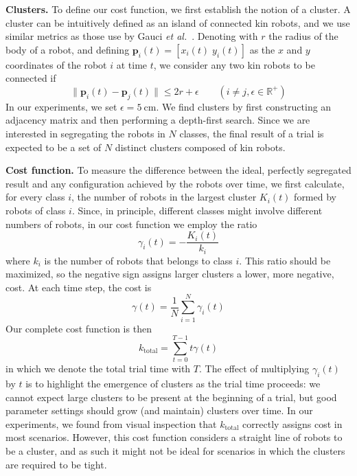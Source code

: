 \documentclass[letterpaper, 10 pt, conference]{ieeeconf}
\newcommand{\myparagraph}[1]{\textbf{#1.}}
\renewcommand{\vec}[1]{\ensuremath{\mathbf{#1}}}
\begin{document}
\myparagraph{Clusters}
To define our cost function, we first establish the notion of a cluster.
A cluster can be intuitively defined as an island of connected kin robots,
and we use similar metrics as those use by Gauci \emph{et al.}~\cite{gauci_evolving_2014}.
Denoting with $r$ the radius of the body of a robot, and defining
$\vec{p}_i(t) = [x_i(t)\;y_i(t)]$ as the $x$ and $y$ coordinates of the robot
$i$ at time $t$, we consider any two kin robots to be connected if
\begin{equation} \label{eq:connected}
  \lVert\vec{p}_i(t) - \vec{p}_j(t)\rVert \le 2r + \epsilon \qquad (i \ne j, \epsilon \in \mathbb{R}^+)
\end{equation}
In our experiments, we set $\epsilon = \SI{5}{\centi\meter}$.
We find clusters by first constructing an adjacency matrix and then performing a depth-first search.
Since we are interested in segregating the robots in $N$ classes,
the final result of a trial is expected to be a set of $N$ distinct clusters composed of kin robots.

\myparagraph{Cost function}
To measure the difference between the ideal, perfectly segregated result and any
configuration achieved by the robots over time, we first calculate, for every
class $i$, the number of robots in the largest cluster $K_i(t)$ formed by robots
of class $i$. Since, in principle, different classes might involve different
numbers of robots, in our cost function we employ the ratio
$$
\gamma_i(t) = -\frac{K_i(t)}{k_i}
$$
where $k_i$ is the number of robots that belongs to class $i$. This ratio should
be maximized, so the negative sign assigns larger clusters a lower, more
negative, cost.  At each time step, the cost is
$$
\gamma(t) = \frac{1}{N}\sum_{i=1}^N\gamma_i(t)
$$
Our complete cost function is then
\begin{equation}
  \label{eq:cost_function}
  k_{\text{total}} =  \sum_{t=0}^{T-1} t\gamma(t)
\end{equation}
in which we denote the total trial time with $T$. The effect of multiplying
$\gamma_i(t)$ by $t$ is to highlight the emergence of clusters as the trial time
proceeds: we cannot expect large clusters to be present at the beginning of a
trial, but good parameter settings should grow (and maintain) clusters over
time. In our experiments, we found from visual inspection that
$k_{\text{total}}$ correctly assigns cost in most scenarios.  However, this cost
function considers a straight line of robots to be a cluster, and as such it
might not be ideal for scenarios in which the clusters are required to be tight.
\end{document}
